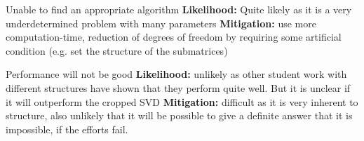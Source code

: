 \documentclass[lang=ngerman,inputenc=utf8,fontsize=10pt]{ldvarticle}
\begin{document}
Unable to find an appropriate algorithm 
\newline\textbf{Likelihood:} Quite likely as it is a very underdetermined problem with many parameters 
\newline\textbf{Mitigation:} use more computation-time, reduction of degrees of freedom by requiring some artificial condition (e.g. set the structure of the submatrices)

Performance will not be good 
\newline\textbf{Likelihood:} unlikely as other student work with different structures have shown that they perform quite well.
But it is unclear if it will outperform the cropped SVD
\newline\textbf{Mitigation:} difficult as it is very inherent to structure, also unlikely that it will be possible to give a definite answer that it is impossible, if the efforts fail.

\printbibliography
\end{document}
